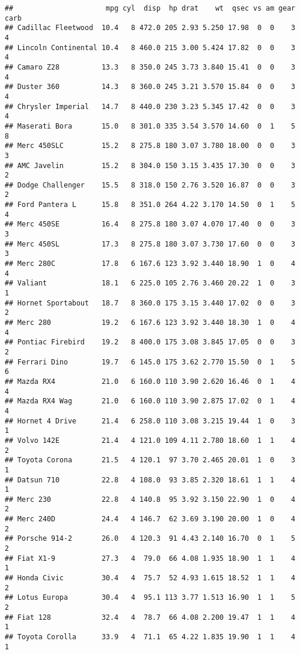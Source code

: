 \documentclass[
]{book}
\begin{document}
\begin{verbatim}
##                      mpg cyl  disp  hp drat    wt  qsec vs am gear carb
## Cadillac Fleetwood  10.4   8 472.0 205 2.93 5.250 17.98  0  0    3    4
## Lincoln Continental 10.4   8 460.0 215 3.00 5.424 17.82  0  0    3    4
## Camaro Z28          13.3   8 350.0 245 3.73 3.840 15.41  0  0    3    4
## Duster 360          14.3   8 360.0 245 3.21 3.570 15.84  0  0    3    4
## Chrysler Imperial   14.7   8 440.0 230 3.23 5.345 17.42  0  0    3    4
## Maserati Bora       15.0   8 301.0 335 3.54 3.570 14.60  0  1    5    8
## Merc 450SLC         15.2   8 275.8 180 3.07 3.780 18.00  0  0    3    3
## AMC Javelin         15.2   8 304.0 150 3.15 3.435 17.30  0  0    3    2
## Dodge Challenger    15.5   8 318.0 150 2.76 3.520 16.87  0  0    3    2
## Ford Pantera L      15.8   8 351.0 264 4.22 3.170 14.50  0  1    5    4
## Merc 450SE          16.4   8 275.8 180 3.07 4.070 17.40  0  0    3    3
## Merc 450SL          17.3   8 275.8 180 3.07 3.730 17.60  0  0    3    3
## Merc 280C           17.8   6 167.6 123 3.92 3.440 18.90  1  0    4    4
## Valiant             18.1   6 225.0 105 2.76 3.460 20.22  1  0    3    1
## Hornet Sportabout   18.7   8 360.0 175 3.15 3.440 17.02  0  0    3    2
## Merc 280            19.2   6 167.6 123 3.92 3.440 18.30  1  0    4    4
## Pontiac Firebird    19.2   8 400.0 175 3.08 3.845 17.05  0  0    3    2
## Ferrari Dino        19.7   6 145.0 175 3.62 2.770 15.50  0  1    5    6
## Mazda RX4           21.0   6 160.0 110 3.90 2.620 16.46  0  1    4    4
## Mazda RX4 Wag       21.0   6 160.0 110 3.90 2.875 17.02  0  1    4    4
## Hornet 4 Drive      21.4   6 258.0 110 3.08 3.215 19.44  1  0    3    1
## Volvo 142E          21.4   4 121.0 109 4.11 2.780 18.60  1  1    4    2
## Toyota Corona       21.5   4 120.1  97 3.70 2.465 20.01  1  0    3    1
## Datsun 710          22.8   4 108.0  93 3.85 2.320 18.61  1  1    4    1
## Merc 230            22.8   4 140.8  95 3.92 3.150 22.90  1  0    4    2
## Merc 240D           24.4   4 146.7  62 3.69 3.190 20.00  1  0    4    2
## Porsche 914-2       26.0   4 120.3  91 4.43 2.140 16.70  0  1    5    2
## Fiat X1-9           27.3   4  79.0  66 4.08 1.935 18.90  1  1    4    1
## Honda Civic         30.4   4  75.7  52 4.93 1.615 18.52  1  1    4    2
## Lotus Europa        30.4   4  95.1 113 3.77 1.513 16.90  1  1    5    2
## Fiat 128            32.4   4  78.7  66 4.08 2.200 19.47  1  1    4    1
## Toyota Corolla      33.9   4  71.1  65 4.22 1.835 19.90  1  1    4    1
\end{verbatim}
\end{document}
